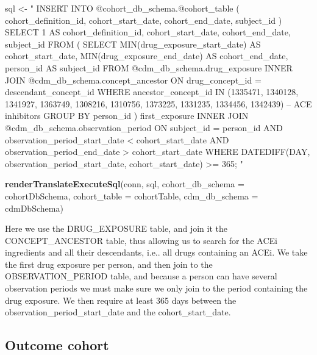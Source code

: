 \documentclass[11pt]{book}
\newenvironment{Shaded}{\begin{snugshade}}{\end{snugshade}}
\newcommand{\KeywordTok}[1]{\textcolor[rgb]{0.13,0.29,0.53}{\textbf{#1}}}
\newcommand{\DataTypeTok}[1]{\textcolor[rgb]{0.13,0.29,0.53}{#1}}
\newcommand{\StringTok}[1]{\textcolor[rgb]{0.31,0.60,0.02}{#1}}
\newcommand{\NormalTok}[1]{#1}
\begin{document}
\begin{Shaded}
\begin{Highlighting}[]
\NormalTok{sql <-}\StringTok{ "}
\StringTok{INSERT INTO @cohort_db_schema.@cohort_table (}
\StringTok{  cohort_definition_id,}
\StringTok{  cohort_start_date,}
\StringTok{  cohort_end_date,}
\StringTok{  subject_id}
\StringTok{)}
\StringTok{SELECT 1 AS cohort_definition_id,}
\StringTok{  cohort_start_date,}
\StringTok{  cohort_end_date,}
\StringTok{  subject_id}
\StringTok{FROM (}
\StringTok{  SELECT MIN(drug_exposure_start_date) AS cohort_start_date,}
\StringTok{    MIN(drug_exposure_end_date) AS cohort_end_date,}
\StringTok{    person_id AS subject_id}
\StringTok{  FROM @cdm_db_schema.drug_exposure}
\StringTok{  INNER JOIN @cdm_db_schema.concept_ancestor}
\StringTok{    ON drug_concept_id = descendant_concept_id}
\StringTok{  WHERE ancestor_concept_id IN (1335471, 1340128, 1341927,}
\StringTok{    1363749, 1308216, 1310756, 1373225, 1331235, 1334456,}
\StringTok{    1342439) -- ACE inhibitors}
\StringTok{  GROUP BY person_id}
\StringTok{) first_exposure}
\StringTok{INNER JOIN @cdm_db_schema.observation_period}
\StringTok{  ON subject_id = person_id}
\StringTok{    AND observation_period_start_date < cohort_start_date}
\StringTok{    AND observation_period_end_date > cohort_start_date}
\StringTok{WHERE DATEDIFF(DAY,}
\StringTok{               observation_period_start_date,}
\StringTok{               cohort_start_date) >= 365;}
\StringTok{"}

\KeywordTok{renderTranslateExecuteSql}\NormalTok{(conn, sql,}
                          \DataTypeTok{cohort_db_schema =}\NormalTok{ cohortDbSchema,}
                          \DataTypeTok{cohort_table =}\NormalTok{ cohortTable,}
                          \DataTypeTok{cdm_db_schema =}\NormalTok{ cdmDbSchema)}
\end{Highlighting}
\end{Shaded}

Here we use the DRUG\_EXPOSURE table, and join it the CONCEPT\_ANCESTOR
table, thus allowing us to search for the ACEi ingredients and all their
descendants, i.e.. all drugs containing an ACEi. We take the first drug
exposure per person, and then join to the OBSERVATION\_PERIOD table, and
because a person can have several observation periods we must make sure
we only join to the period containing the drug exposure. We then require
at least 365 days between the observation\_period\_start\_date and the
cohort\_start\_date.

\subsection{Outcome cohort}\label{outcome-cohort}
\end{document}
